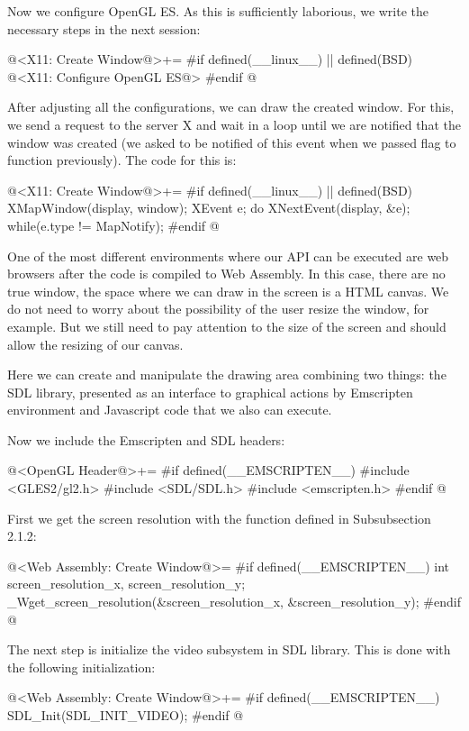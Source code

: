 Now we configure OpenGL ES. As this is sufficiently laborious, we
write the necessary steps in the next session:

\iniciocodigo
@<X11: Create Window@>+=
#if defined(__linux__) || defined(BSD)
@<X11: Configure OpenGL ES@>
#endif
@
\fimcodigo

After adjusting all the configurations, we can draw the created
window. For this, we send a request to the server X and wait in a loop
until we are notified that the window was created (we asked to be
notified of this event when we passed
flag  to
function  previously). The code for this is:

\iniciocodigo
@<X11: Create Window@>+=
#if defined(__linux__) || defined(BSD)
XMapWindow(display, window);
{
  XEvent e;
  do{
    XNextEvent(display, &e);
  } while(e.type != MapNotify);
}
#endif
@
\fimcodigo


One of the most different environments where our API can be executed
are web browsers after the code is compiled to Web Assembly. In this
case, there are no true window, the space where we can draw in the
screen is a HTML canvas. We do not need to worry about the possibility
of the user resize the window, for example. But we still need to pay
attention to the size of the screen and should allow the resizing of
our canvas.

Here we can create and manipulate the drawing area combining two
things: the SDL library, presented as an interface to graphical
actions by Emscripten environment and Javascript code that we also can
execute.

Now we include the Emscripten and SDL headers:

\iniciocodigo
@<OpenGL Header@>+=
#if defined(__EMSCRIPTEN__)
#include <GLES2/gl2.h>
#include <SDL/SDL.h>
#include <emscripten.h>
#endif
@
\fimcodigo

First we get the screen resolution with the function defined in
Subsubsection 2.1.2:

\iniciocodigo
@<Web Assembly: Create Window@>=
#if defined(__EMSCRIPTEN__)
int screen_resolution_x, screen_resolution_y;
_Wget_screen_resolution(&screen_resolution_x, &screen_resolution_y);
#endif
@
\fimcodigo

The next step is initialize the video subsystem in SDL library. This
is done with the following initialization:

\iniciocodigo
@<Web Assembly: Create Window@>+=
#if defined(__EMSCRIPTEN__)
SDL_Init(SDL_INIT_VIDEO);
#endif
@
\fimcodigo

